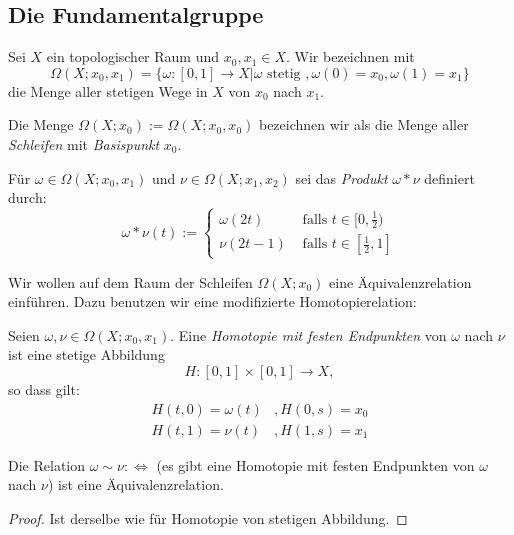 \documentclass[a4paper,10pt]{scrartcl}
\begin{document}
\subsection{Die Fundamentalgruppe}
\begin{df}
 Sei $X$ ein topologischer Raum und $x_0, x_1 \in X$. Wir bezeichnen mit
\[
 \Omega(X; x_0,x_1)=\{\omega: [0,1]\to X|\omega \text{ stetig }, \omega(0)=x_0, \omega(1)=x_1 \}
\]
die Menge aller stetigen Wege in $X$ von $x_0$ nach $x_1$. 
\begin{figure}[H]
\centering
 \fixme[fig48]
\caption{}
\end{figure}
Die Menge $\Omega(X; x_0):=\Omega(X; x_0, x_0)$ bezeichnen wir als die Menge aller \emph{Schleifen} mit \emph{Basispunkt} $x_0$.
\end{df}
\begin{df} Für $\omega\in \Omega(X; x_0, x_1)$ und $\nu\in \Omega(X; x_1, x_2)$ sei das \emph{Produkt} $\omega*\nu$ definiert durch:
 \[
  \omega*\nu(t):=\begin{cases} \omega(2t) &\text{ falls } t\in[0,\frac{1}{2})\\ \nu(2t-1) &\text{ falls } t\in[\frac{1}{2}, 1] \end{cases}
 \]
\begin{figure}[H]
\centering
 \fixme[fig49]
\caption{}
\end{figure}
\end{df}
Wir wollen auf dem Raum der Schleifen $\Omega(X; x_0)$ eine Äquivalenzrelation einführen. Dazu benutzen wir eine modifizierte Homotopierelation:
\begin{df}
\begin{figure}[H]
\centering
 \fixme[fig50]
\caption{}
\end{figure}
 Seien $\omega, \nu \in \Omega(X; x_0, x_1)$. Eine \emph{Homotopie mit festen Endpunkten} von $\omega$ nach $\nu$ ist eine stetige Abbildung
\[
 H: [0,1]\times [0,1] \to X,
\]
so dass gilt: 
\begin{align*}
 H(t,0)=\omega(t)&, H(0,s)=x_0\\
 H(t,1)=\nu(t)&, H(1,s)=x_1
\end{align*}
\end{df}
\begin{lem}
 Die Relation $\omega\sim \nu:\iff$ (es gibt eine Homotopie mit festen Endpunkten von $\omega$ nach $\nu$) ist eine Äquivalenzrelation.
\end{lem}
\begin{proof}
 Ist derselbe wie für Homotopie von stetigen Abbildung.
\end{proof}
\end{document}
